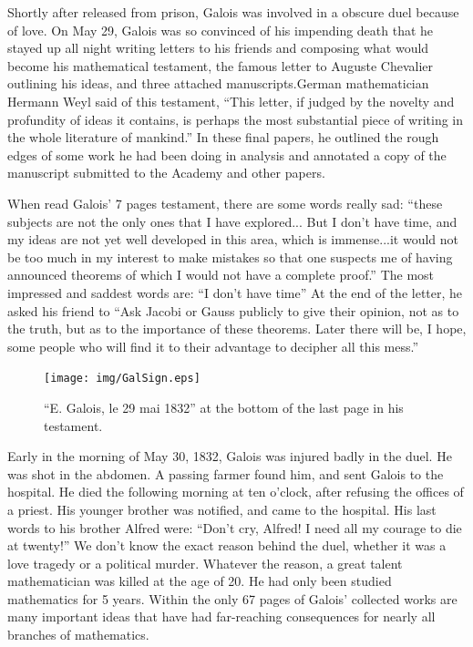 \documentclass{article}
\begin{document}
Shortly after released from prison, Galois was involved in a obscure duel because of love. On May 29, Galois was so convinced of his impending death that he stayed up all night writing letters to his friends and composing what would become his mathematical testament, the famous letter to Auguste Chevalier outlining his ideas, and three attached manuscripts.German mathematician Hermann Weyl said of this testament, ``This letter, if judged by the novelty and profundity of ideas it contains, is perhaps the most substantial piece of writing in the whole literature of mankind.'' In these final papers, he outlined the rough edges of some work he had been doing in analysis and annotated a copy of the manuscript submitted to the Academy and other papers.

When read Galois' 7 pages testament, there are some words really sad: ``these subjects are not the only ones that I have explored... But I don't have time, and my ideas are not yet well developed in this area, which is immense...it would not be too much in my interest to make mistakes so that one suspects me of having announced theorems of which I would not have a complete proof.'' The most impressed and saddest words are: ``I don't have time'' At the end of the letter, he asked his friend to ``Ask Jacobi or Gauss publicly to give their opinion, not as to the truth, but as to the importance of these theorems. Later there will be, I hope, some people who will find it to their advantage to decipher all this mess.''\cite{Galois-1832}

\begin{figure}[htbp]
 \centering
 \texttt{[image: img/GalSign.eps]}
 \captionsetup{labelformat=empty}
 \caption{``E. Galois, le 29 mai 1832'' at the bottom of the last page in his testament.}
 \label{fig:GalSign}
\end{figure}

Early in the morning of May 30, 1832, Galois was injured badly in the duel. He was shot in the abdomen. A passing farmer found him, and sent Galois to the hospital. He died the following morning at ten o'clock, after refusing the offices of a priest. His younger brother was notified, and came to the hospital. His last words to his brother Alfred were: ``Don't cry, Alfred! I need all my courage to die at twenty!'' We don't know the exact reason behind the duel, whether it was a love tragedy or a political murder. Whatever the reason, a great talent mathematician was killed at the age of 20. He had only been studied mathematics for 5 years. Within the only 67 pages of Galois' collected works are many important ideas that have had far-reaching consequences for nearly all branches of mathematics.
\end{document}
